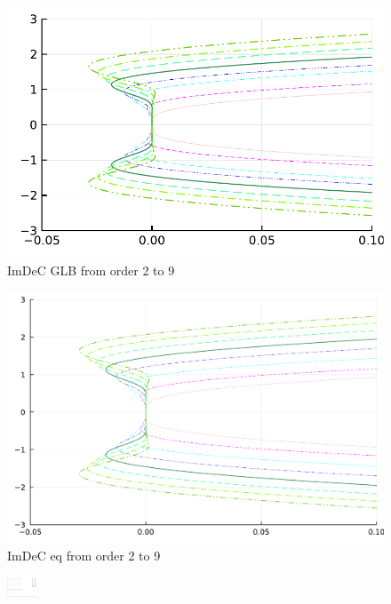 \begin{figure}
	\begin{minipage}[t]{0.45\textwidth}
		\includegraphics[width=\textwidth]{pdf/odepics/IMEXDeC_gaussLobatto_zoom.pdf}
		\centering
		ImDeC GLB from order 2 to 9
	\end{minipage}
	\begin{minipage}[t]{0.45\textwidth}
		\includegraphics[width=\textwidth]{pdf/odepics/IMEXDeC_equispaced_zoom.pdf}
		\centering
		ImDeC eq from order 2 to 9
	\end{minipage}
	\includegraphics[width=0.08\textwidth, trim={491 140 30 23}, clip]{pdf/odepics/colors_a-d_new_2-13_no_order.pdf}\\	
	\begin{minipage}[t]{0.45\textwidth}

\end{minipage}
\end{figure}
